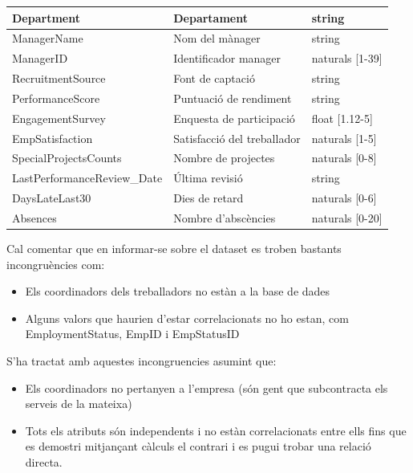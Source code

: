 \documentclass[a4paper, 11pt]{article}
\begin{document}
\begin{table}[h]
\begin{tabular}{l|l|l}
        Department & Departament & string\\\hline
        ManagerName & Nom del mànager & string\\\hline
        ManagerID & Identificador manager & naturals [1-39]\\\hline
        RecruitmentSource & Font de captació & string\\\hline
        PerformanceScore & Puntuació de rendiment & string\\\hline
        EngagementSurvey & Enquesta de participació & float [1.12-5]\\\hline
        EmpSatisfaction & Satisfacció del treballador & naturals [1-5]\\\hline
        SpecialProjectsCounts & Nombre de projectes & naturals [0-8]\\\hline
        LastPerformanceReview\_Date & Última revisió & string\\\hline
        DaysLateLast30 & Dies de retard & naturals [0-6]\\\hline
        Absences & Nombre d'abscències & naturals [0-20]\\
    \end{tabular}
    \label{tab:my_label}
\end{table}
Cal comentar que en informar-se sobre el dataset es troben bastants incongruències com:
\begin{itemize}
    \item Els coordinadors dels treballadors no estàn a la base de dades
    \item Alguns valors que haurien d'estar correlacionats no ho estan, com EmploymentStatus, EmpID i EmpStatusID
\end{itemize}
S'ha tractat amb aquestes incongruencies asumint que:
\begin{itemize}
    \item Els coordinadors no pertanyen a l'empresa (són gent que subcontracta els serveis de la mateixa)
    \item Tots els atributs són independents i no estàn correlacionats entre ells fins que es demostri mitjançant càlculs el contrari i es pugui trobar una relació directa. 
\end{itemize} \label{axiomes}
\newpage
\end{document}
